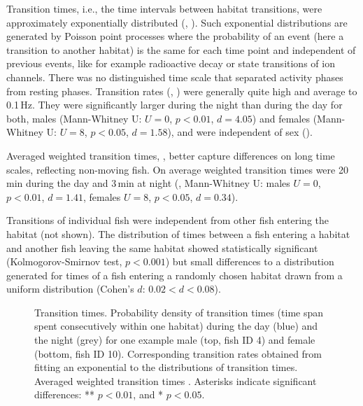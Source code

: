 Transition times, i.e., the time intervals between habitat transitions, were approximately exponentially distributed (, ). Such exponential distributions are generated by Poisson point processes where the probability of
an event (here a transition to another habitat) is the same for each time point and independent of previous events, like for example radioactive decay or state transitions of ion channels. There was no distinguished time scale that separated activity phases from resting phases. Transition rates (, ) were generally quite high and average to 0.1\,Hz. They were significantly larger during the night than during the day for both, males (Mann-Whitney U: $U=0$, $p<0.01$, $d =
4.05$) and females (Mann-Whitney U: $U=8$, $p<0.05$, $d = 1.58$), and were independent of sex ().

Averaged weighted transition times, , better capture differences on long time scales, reflecting non-moving fish. On average weighted transition times were 20\,min during the day and 3\,min at night (, Mann-Whitney U: males $U=0$, $p<0.01$, $d=1.41$, females $U=8$, $p<0.05$, $d=0.34$).

Transitions of individual fish were independent from other fish entering the habitat (not shown). The distribution of times between a fish entering a habitat and another fish leaving
the same habitat showed statistically significant (Kolmogorov-Smirnov test, $p<0.001$) but small differences to a distribution generated for times of a fish entering a randomly chosen habitat drawn from a uniform distribution (Cohen's $d$: $0.02<d<0.08$).

\begin{figure*}[t]
  \caption{\label{transitiontimes} Transition times. 
    Probability density of transition times (time span spent
    consecutively within one habitat) during the day (blue) and the
    night (grey) for one example male (top, fish ID 4) and female
    (bottom, fish ID 10).  Corresponding transition rates
    obtained from fitting an exponential to the distributions of
    transition times.  Averaged weighted transition times
    . Asterisks indicate significant differences:
    ** $p<0.01$, and * $p<0.05$.}
\end{figure*}


